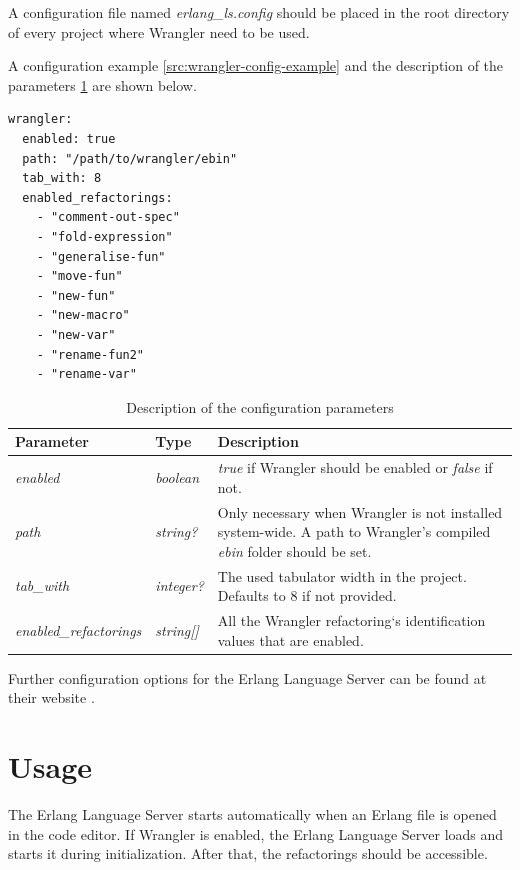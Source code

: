A configuration file named \emph{erlang\_ls.config} should be placed in the root directory of every project where Wrangler need to be used.

A configuration example \ref{src:wrangler-config-example} and the description of the parameters \ref{tab:wrangler-config-descr} are shown below.

\begin{lstlisting}
wrangler:
  enabled: true
  path: "/path/to/wrangler/ebin" 
  tab_with: 8
  enabled_refactorings:
    - "comment-out-spec"
    - "fold-expression"
    - "generalise-fun"
    - "move-fun"
    - "new-fun"
    - "new-macro"
    - "new-var"
    - "rename-fun2"
    - "rename-var"
\end{lstlisting}


\begin{table}[H]
	\centering
	\begin{tabular}{ | m{} | m{} | m{} | }
		\hline
		\textbf{Parameter} & \textbf{Type} & \textbf{Description} \\
		\hline \hline
		\emph{enabled} & \emph{boolean} & \emph{true} if Wrangler should be enabled or \emph{false} if not. \\
		\hline
		\emph{path} & \emph{string?} & Only necessary when Wrangler is not installed system-wide. A path to Wrangler's compiled \emph{ebin} folder should be set. \\
		\hline
		\emph{tab\_with} & \emph{integer?} & The used tabulator width in the project. Defaults to 8 if not provided. \\
		\hline
		\emph{enabled\_refactorings} & \emph{string[]} & All the Wrangler refactoring`s identification values that are enabled.\\
		\hline
	\end{tabular}
	\caption{Description of the configuration parameters}
	\label{tab:wrangler-config-descr}
\end{table}

Further configuration options for the Erlang Language Server can be found at their website \cite{ELSConfig}.

\section{Usage}

The Erlang Language Server starts automatically when an Erlang file is opened in the code editor. If Wrangler is enabled, the Erlang Language Server loads and starts it during initialization. After that, the refactorings should be accessible.

